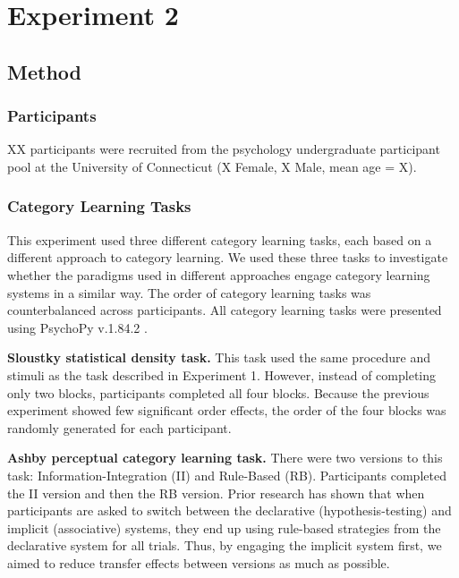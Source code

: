 \documentclass[../dissertation.tex]{subfiles}
\begin{document}
\section{Experiment 2}

\subsection{Method}
\subsubsection{Participants}
XX participants were recruited from the psychology undergraduate participant pool at the University of Connecticut (X Female, X Male, mean age = X).
\subsubsection{Category Learning Tasks}
This experiment used three different category learning tasks, each based on a different approach to category learning. We used these three tasks to investigate whether the paradigms used in different approaches engage category learning systems in a similar way. The order of category learning tasks was counterbalanced across participants. All category learning tasks were presented using PsychoPy v.1.84.2 \citep{Peirce2007}. \par 
\textbf{Sloustky statistical density task.} This task used the same procedure and stimuli as the task described in Experiment 1. However, instead of completing only two blocks, participants completed all four blocks. Because the previous experiment showed few significant order effects, the order of the four blocks was randomly generated for each participant. \par
\textbf{Ashby perceptual category learning task.} There were two versions to this task: Information-Integration (II) and Rule-Based (RB). Participants completed the II version and then the RB version. Prior research has shown that when participants are asked to switch between the declarative (hypothesis-testing) and implicit (associative) systems, they end up using rule-based strategies from the declarative system for all trials. Thus, by engaging the implicit system first, we aimed to reduce transfer effects between versions as much as possible. \par
\end{document}
